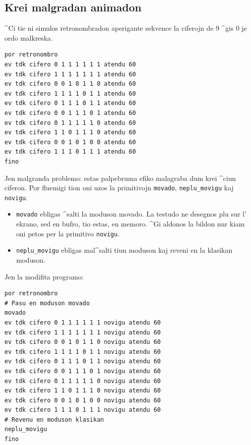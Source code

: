\subsection{Krei malgradan animadon}
^Ci tie ni simulos retronombradon aperigante sekvence la ciferojn de
$9$ ^gis $0$ je ordo malkreska.
\begin{verbatim}
por retronombro
ev tdk cifero 0 1 1 1 1 1 1 atendu 60
ev tdk cifero 1 1 1 1 1 1 1 atendu 60
ev tdk cifero 0 0 1 0 1 1 0 atendu 60
ev tdk cifero 1 1 1 1 0 1 1 atendu 60
ev tdk cifero 0 1 1 1 0 1 1 atendu 60
ev tdk cifero 0 0 1 1 1 0 1 atendu 60
ev tdk cifero 0 1 1 1 1 1 0 atendu 60
ev tdk cifero 1 1 0 1 1 1 0 atendu 60
ev tdk cifero 0 0 1 0 1 0 0 atendu 60
ev tdk cifero 1 1 1 0 1 1 1 atendu 60
fino
\end{verbatim}

Jen malgranda problemo: estas palpebruma efiko malagraba dum krei
^ciun ciferon.  Por fluemigi tion oni uzos la primitivojn
\texttt{movado}, \texttt{neplu\_movigu} kaj \texttt{novigu}.
\begin{itemize}
\item \texttt{movado} ebligas ^salti la moduson \og movado\fg.  La
  testudo ne desegnos plu sur l' ekrano, sed en bufro, tio estas, en
  memoro.  ^Gi aldonos la bildon nur kiam oni petos per la primitivo
  \texttt{novigu}.
\item \texttt{neplu\_movigu} ebligas mal^salti tiun moduson kaj reveni
  en la klasikan moduson.
\end{itemize}
Jen la modifita programo:
\begin{verbatim}
por retronombro
# Pasu en moduson movado
movado
ev tdk cifero 0 1 1 1 1 1 1 novigu atendu 60
ev tdk cifero 1 1 1 1 1 1 1 novigu atendu 60
ev tdk cifero 0 0 1 0 1 1 0 novigu atendu 60
ev tdk cifero 1 1 1 1 0 1 1 novigu atendu 60
ev tdk cifero 0 1 1 1 0 1 1 novigu atendu 60
ev tdk cifero 0 0 1 1 1 0 1 novigu atendu 60
ev tdk cifero 0 1 1 1 1 1 0 novigu atendu 60
ev tdk cifero 1 1 0 1 1 1 0 novigu atendu 60
ev tdk cifero 0 0 1 0 1 0 0 novigu atendu 60
ev tdk cifero 1 1 1 0 1 1 1 novigu atendu 60
# Revenu en moduson klasikan
neplu_movigu
fino
\end{verbatim}

